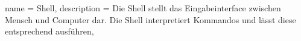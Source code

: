 \usepackage[
	toc,
]{glossaries}


{
  name			=	Shell,
  description	=	{Die Shell stellt das Eingabeinterface zwischen Mensch und Computer dar. Die Shell interpretiert Kommandos und lässt diese entsprechend ausführen},
}


%
\makeglossaries
